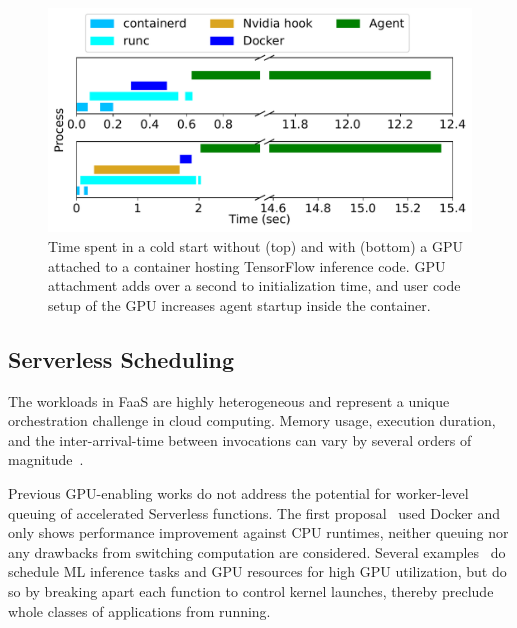 \begin{figure}
  \includegraphics[width=\textwidth]{mqfq/graphs/coldstart/combined_timeline.pdf}
  \caption{Time spent in a cold start without (top) and with (bottom) a GPU attached to a container hosting TensorFlow inference code.
          GPU attachment adds over a second to initialization time, 
          and user code setup of the GPU increases agent startup inside the container. 
          }
    \label{fig:cold-timeline}
\end{figure}

\subsection{Serverless Scheduling}

The workloads in FaaS are highly heterogeneous and represent a unique orchestration challenge in cloud computing.
Memory usage, execution duration, and the inter-arrival-time between invocations can vary by several orders of magnitude~\cite{shahrad2020serverless}.


Previous GPU-enabling works do not address the potential for worker-level queuing of accelerated Serverless functions.
The first proposal~\cite{naranjo2020accelerated} used Docker and only shows performance improvement against CPU runtimes, neither queuing nor any drawbacks from switching computation are considered. 
Several examples~\cite{pemberton2022kernel,gu2023fast,ng2023paella} do schedule ML inference tasks and GPU resources for high GPU utilization, but do so by breaking apart each function to control kernel launches, thereby preclude whole classes of applications from running.

